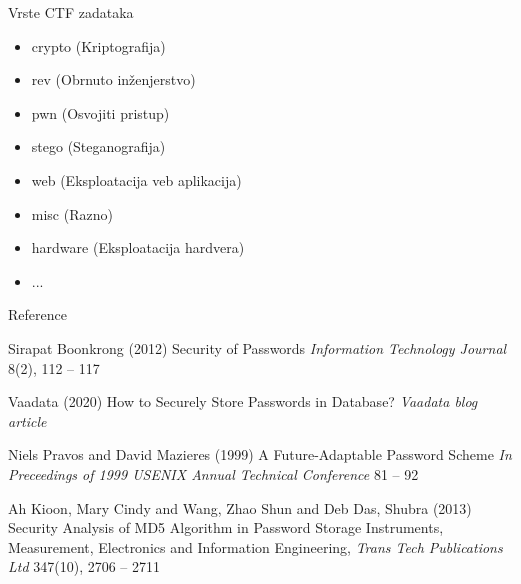 \documentclass[aspectratio=169,xcolor=dvipsnames]{beamer}
\begin{document}

\begin{frame}{Vrste CTF zadataka}

    \begin{itemize}
        \item crypto (Kriptografija)\pause
        \item rev (Obrnuto inženjerstvo)\pause
        \item pwn (Osvojiti pristup)\pause
        \item stego (Steganografija)\pause
        \item web (Eksploatacija veb aplikacija)\pause
        \item misc (Razno)\pause
        \item hardware (Eksploatacija hardvera)\pause
        \item ...
    \end{itemize}

\end{frame}


\begin{frame}{Reference}
    \footnotesize{
        \begin{thebibliography}{99}
             Sirapat Boonkrong (2012)
                \newblock Security of Passwords
                \newblock \emph{Information Technology Journal} 8(2),
                112 -- 117

             Vaadata (2020)
                \newblock How to Securely Store Passwords in Database?
                \newblock \emph{Vaadata blog article}

             Niels Pravos and
                David Mazieres (1999)
                \newblock A Future-Adaptable Password Scheme
                \newblock \emph{In Preceedings of 1999 USENIX Annual Technical
                Conference} 81 -- 92

             Ah Kioon,
                Mary Cindy and Wang, Zhao Shun and Deb Das, Shubra (2013)
                \newblock Security Analysis of MD5 Algorithm in Password
                Storage
                \newblock Instruments, Measurement, Electronics and
                Information Engineering,
                \emph{Trans Tech Publications Ltd} 347(10),
                2706 -- 2711

        \end{thebibliography}
    }
\end{frame}
\end{document}
